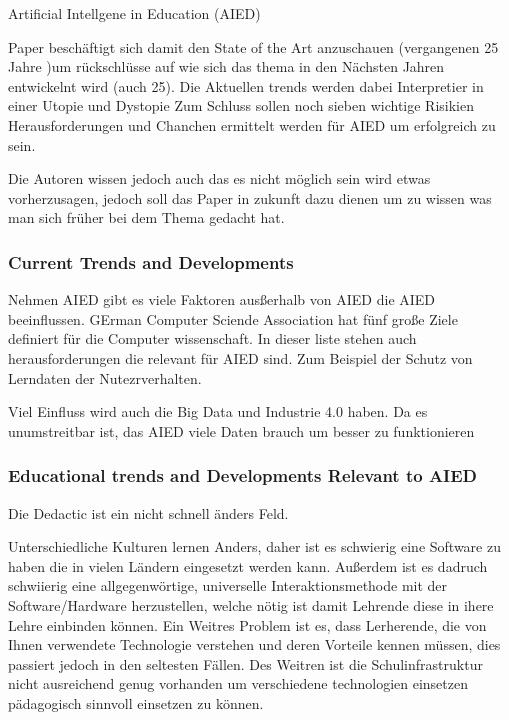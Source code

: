 Artificial Intellgene in Education (AIED)

Paper beschäftigt sich damit den State of the Art anzuschauen (vergangenen 25 Jahre )um rückschlüsse auf wie sich das
thema in den Nächsten Jahren entwickelnt wird (auch 25). Die Aktuellen trends werden dabei Interpretier in einer Utopie und Dystopie
Zum Schluss sollen noch sieben wichtige Risikien Herausforderungen und Chanchen ermittelt werden für AIED um erfolgreich zu sein.

Die Autoren wissen jedoch auch das es nicht möglich sein wird etwas vorherzusagen, jedoch soll das Paper in zukunft dazu dienen um zu wissen was man sich früher bei dem Thema gedacht hat.


\subsubsection*{Current Trends and Developments}

Nehmen AIED gibt es viele Faktoren ausßerhalb von AIED die AIED beeinflussen.
GErman Computer Sciende Association hat fünf große Ziele definiert für die Computer wissenschaft. In dieser
liste stehen auch herausforderungen die relevant für AIED sind. Zum Beispiel der Schutz von Lerndaten der Nutezrverhalten.

Viel Einfluss wird auch die Big Data und Industrie 4.0 haben. Da es unumstreitbar ist, das AIED viele Daten brauch um besser zu funktionieren

\subsubsection{Educational trends and Developments Relevant to AIED}
Die Dedactic ist ein nicht schnell änders Feld.


Unterschiedliche Kulturen lernen Anders, daher ist es schwierig eine Software zu haben die in vielen Ländern eingesetzt werden kann.
Außerdem ist es dadruch schwiierig eine allgegenwörtige, universelle Interaktionsmethode mit der Software/Hardware herzustellen,
welche nötig ist damit Lehrende diese in ihere Lehre einbinden können. 
Ein Weitres Problem ist es, dass Lerherende, die von Ihnen verwendete Technologie verstehen und deren Vorteile kennen müssen,
dies passiert jedoch in den seltesten Fällen. Des Weitren ist die Schulinfrastruktur nicht ausreichend genug vorhanden um verschiedene technologien einsetzen pädagogisch sinnvoll einsetzen zu können.

